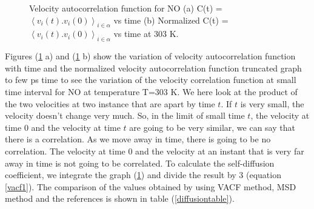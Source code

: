  \begin{figure}[h!]
 \begin{center}
 \caption[ Plot of velocity autocorrelation function with time for NO in water.] { Velocity autocorrelation function for NO (a) C(t) = $\left\langle v_i(t).v_i(0) \right\rangle_{i \in \alpha}$ vs time  (b)  Normalized C(t) = $\left\langle v_i(t).v_i(0) \right\rangle_{i \in \alpha}$  vs time at 303 K. }
 \label{velauto}
 \end{center}
 \end{figure}
 Figures (\ref{velauto} a) and  (\ref{velauto} b)   show the variation of velocity autocorrelation function with
time and the normalized velocity autocorrelation function  truncated graph to few ps time to see the variation of the velocity correlation function at small time interval for NO at temperature T=303 K. We here look at the product of the two velocities at two instance that are apart by time $t$. If $t$ is very small, the velocity doesn't change very much. So, in the limit of small time $t$, the velocity
at time $0$ and the velocity at  time $t$ are going to be very similar, we can say that there is a correlation. As we move away in time, there is going to be no correlation. The velocity at time $0$ and the velocity at an instant that is very far away in time is not going to be
correlated. To calculate the self-diffusion coefficient, we integrate the graph (\ref{velauto}) and divide the result by 3 (equation \ref{vacf1}). The comparison of the values obtained by using  VACF method, MSD method and the references is shown in
table (\ref{diffusiontable}).

